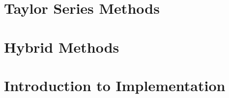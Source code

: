 \section{Taylor Series Methods}


\section{Hybrid Methods}


\section{Introduction to Implementation}

